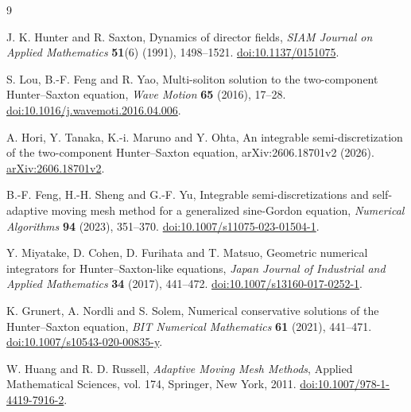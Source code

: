 \documentclass{article}
\begin{document}
\renewcommand{\refname}{References}
\begin{thebibliography}{9}

J. K. Hunter and R. Saxton,
Dynamics of director fields,
\textit{SIAM Journal on Applied Mathematics} \textbf{51}(6) (1991), 1498--1521.
\href{https://doi.org/10.1137/0151075}{doi:10.1137/0151075}.

S. Lou, B.-F. Feng and R. Yao,
Multi-soliton solution to the two-component Hunter--Saxton equation,
\textit{Wave Motion} \textbf{65} (2016), 17--28.
\href{https://doi.org/10.1016/j.wavemoti.2016.04.006}{doi:10.1016/j.wavemoti.2016.04.006}.

A. Hori, Y. Tanaka, K.-i. Maruno and Y. Ohta,
An integrable semi-discretization of the two-component Hunter--Saxton equation,
arXiv:2606.18701v2 (2026).
\href{https://arxiv.org/abs/2606.18701v2}{arXiv:2606.18701v2}.

B.-F. Feng, H.-H. Sheng and G.-F. Yu,
Integrable semi-discretizations and self-adaptive moving mesh method for a generalized sine-Gordon equation,
\textit{Numerical Algorithms} \textbf{94} (2023), 351--370.
\href{https://doi.org/10.1007/s11075-023-01504-1}{doi:10.1007/s11075-023-01504-1}.

Y. Miyatake, D. Cohen, D. Furihata and T. Matsuo,
Geometric numerical integrators for Hunter--Saxton-like equations,
\textit{Japan Journal of Industrial and Applied Mathematics} \textbf{34} (2017), 441--472.
\href{https://doi.org/10.1007/s13160-017-0252-1}{doi:10.1007/s13160-017-0252-1}.

K. Grunert, A. Nordli and S. Solem,
Numerical conservative solutions of the Hunter--Saxton equation,
\textit{BIT Numerical Mathematics} \textbf{61} (2021), 441--471.
\href{https://doi.org/10.1007/s10543-020-00835-y}{doi:10.1007/s10543-020-00835-y}.

W. Huang and R. D. Russell,
\textit{Adaptive Moving Mesh Methods},
Applied Mathematical Sciences, vol. 174, Springer, New York, 2011.
\href{https://doi.org/10.1007/978-1-4419-7916-2}{doi:10.1007/978-1-4419-7916-2}.

\end{thebibliography}
\end{document}

